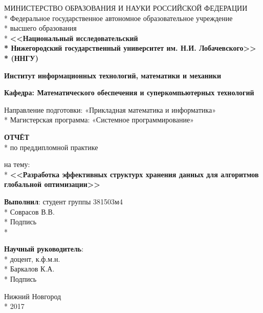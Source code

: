 \begin{titlepage}

\begin{center}
МИНИСТЕРСТВО ОБРАЗОВАНИЯ И НАУКИ РОССИЙСКОЙ ФЕДЕРАЦИИ \\*
Федеральное   государственное  автономное  образовательное  учреждение \\*
высшего образования \\*
\textbf{<<Национальный исследовательский \\*
Нижегородский государственный университет им. Н.И. Лобачевского>> \\*
(ННГУ)}
\end{center}

\vspace{12pt}

\begin{center}
\textbf{Институт информационных технологий, математики и механики}
\end{center}

\begin{center}
\textbf{Кафедра: Математического обеспечения и суперкомпьютерных технологий}
\end{center}

\vspace{25pt}
\begin{center}
Направление подготовки: «Прикладная математика и информатика» \\*
Магистерская программа: «Системное программирование»
\end{center}
\vspace{30pt}

\begin{center}
\fontsize{18pt}{0pt}\textbf{ОТЧЁТ} \\*
по преддипломной практике
\end{center}
\begin{center}
на тему: \\*
\fontsize{16pt}{0pt}\textbf{<<Разработка эффективных структурх хранения данных для алгоритмов глобальной оптимизации>>}
\end{center}

\vspace{53pt}

\begin{flushright}
\textbf{Выполнил}: студент группы 381503м4 \\*
 Соврасов В.В. \\*
Подпись  \\*

\textbf{Научный руководитель}:  \\*
доцент, к.ф.м.н.  \\*
 Баркалов К.А. \\*
Подпись 
\end{flushright}

\vspace{\fill}

\begin{center}
Нижний Новгород \\*
2017
\end{center}

\end{titlepage}
